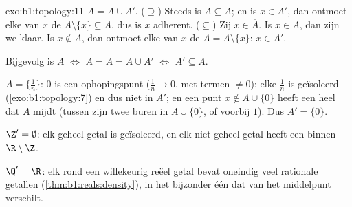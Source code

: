 \begin{solution}{exo:b1:topology:11}
$\overline A = A \cup A'$. ($\supseteq$) Steeds is $A \subseteq \overline
A$; en is $x \in A'$, dan ontmoet elke  van $x$ de  $A
\setminus \{x\} \subseteq A$, dus is $x$ adherent. ($\subseteq$) Zij $x
\in \overline A$. Is $x \in A$, dan zijn we klaar. Is $x \notin A$, dan
ontmoet elke  van $x$ de  $A = A \setminus \{x\}$: $x
\in A'$.

Bijgevolg is $A$  $\iff$ $A = \overline A = A \cup A'$ $\iff$ $A'
\subseteq A$.

$A = \{\frac 1n\}$: $0$ is een ophopingspunt ($\frac 1n \to 0$, met
termen $\neq 0$); elke $\frac 1n$ is geïsoleerd
(\cref{exo:b1:topology:7}) en dus niet in $A'$; en een punt $x \notin A
\cup \{0\}$ heeft een heel  dat $A$ mijdt (tussen zijn twee buren
in $A \cup \{0\}$, of voorbij $1$). Dus $A' = \{0\}$.

$\Z' = \emptyset$: elk geheel getal is geïsoleerd, en elk niet-geheel
getal heeft een  binnen $\R \setminus \Z$.

$\Q' = \R$: elk  rond een willekeurig reëel getal bevat oneindig
veel rationale getallen (\cref{thm:b1:reals:density}), in het bijzonder
één dat van het middelpunt verschilt.
\end{solution}

